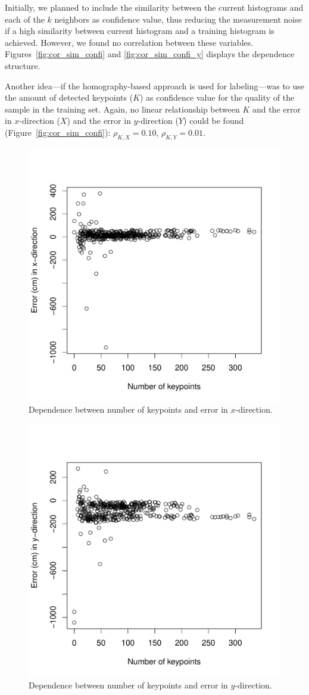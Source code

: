 \documentclass{report}
\begin{document}
Initially, we planned to include the similarity between the current
histograms and each of the $k$ neighbors as confidence value, thus
reducing the measurement noise if a high similarity between current
histogram and a training histogram is achieved. However, we found no
correlation between these variables. Figures~\ref{fig:cor_sim_confi}
and \ref{fig:cor_sim_confi_y} displays the dependence structure.

Another idea---if the homography-based approach is used for
labeling---was to use the amount of detected keypoints ($K$) as
confidence value for the quality of the sample in the training
set. Again, no linear relationship between $K$ and the error in
$x$-direction ($X$) and the error in $y$-direction ($Y$) could be
found (Figure~\ref{fig:cor_sim_confi}): $\rho_{K, X} = 0.10$,
$\rho_{K, Y} = 0.01$.

\begin{figure}[h!]
\begin{center}
\includegraphics[width=0.448\columnwidth]{keypoints_error_x1}
\caption{{Dependence between number of keypoints and error in $x$-direction.%
}}
\end{center}
\end{figure}

\begin{figure}[h!]
\begin{center}
\includegraphics[width=0.448\columnwidth]{keypoints_error_y}
\caption{{Dependence between number of keypoints and error in $y$-direction.%
}}
\end{center}
\end{figure}
\end{document}
